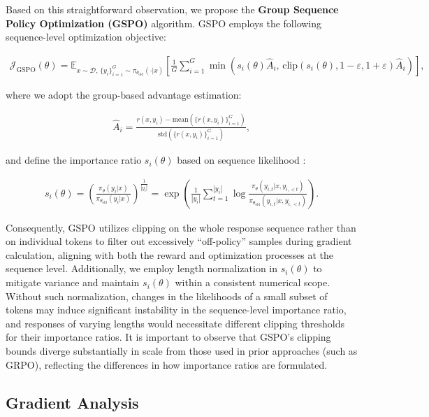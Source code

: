 Based on this straightforward observation, we propose the \textbf{Group Sequence Policy Optimization (GSPO)} algorithm. GSPO employs the following sequence-level optimization objective:

\begin{align}
\mathcal{J}_\text{GSPO} (\theta) =
\mathbb{E}_{ x \sim \mathcal{D},\, \{y_i\}_{i=1}^G \sim \pi_{\theta_\text{old}}( \cdot | x) }
\left[ 
\frac{1}{G} \sum_{i=1}^{G}
\min \left( s_{i}(\theta)  \widehat{A}_{i},  \, \mathrm{clip} \left( s_{i}(\theta), 1 - {\varepsilon}, 1 + {\varepsilon} \right) \widehat{A}_{i} \right) 
\right],
\label{equ:gspo}
\end{align}

where we adopt the group-based advantage estimation:

\begin{align}
\widehat{A}_{i} = \frac{r(x, y_i) - \mathrm{mean} \left( \{ r(x, y_i) \}_{i=1}^G \right) }{ \mathrm{std} \left( \{ r(x, y_i) \}_{i=1}^G \right) },
\end{align}

and define the importance ratio $s_{i}(\theta)$ based on sequence likelihood \citep{click}:

\begin{align}
s_{i}(\theta) = \left( \frac{ \pi_{\theta} (y_i | x) }{ \pi_{\theta_\text{old}} (y_i | x)} \right)^{\frac{1}{|y_i|}}
=
\exp \left( \frac{1}{|y_i|} \sum_{t=1}^{|y_i|} \log \frac{ \pi_{\theta} (y_{i,t} | x, y_{i,<t}) }{ \pi_{\theta_\text{old}} (y_{i,t} | x,y_{i,<t})} \right).
\end{align}

Consequently, GSPO utilizes clipping on the whole response sequence rather than on individual tokens to filter out excessively ``off-policy'' samples during gradient calculation, aligning with both the reward and optimization processes at the sequence level. Additionally, we employ length normalization in $s_{i}(\theta)$ to mitigate variance and maintain $s_{i}(\theta)$ within a consistent numerical scope. Without such normalization, changes in the likelihoods of a small subset of tokens may induce significant instability in the sequence-level importance ratio, and responses of varying lengths would necessitate different clipping thresholds for their importance ratios. It is important to observe that GSPO's clipping bounds diverge substantially in scale from those used in prior approaches (such as GRPO), reflecting the differences in how importance ratios are formulated.

\subsection{Gradient Analysis}
\label{subsec:gradient}


